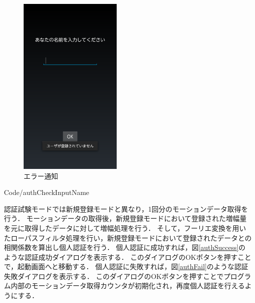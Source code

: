 \documentclass[11pt]{jreport}
\renewcommand{\slash}{/}
\begin{document}
\begin{figure}[htbp]
            \begin{minipage}{0.33\hsize}
                \begin{center}
                    \includegraphics[width=5cm, bb=0 0 540 960]{AuthNameInputError.pdf}
                \end{center}
                \caption{エラー通知}
                \label{authNameInputError}
            \end{minipage}
        \end{figure}

        \newpage
        
        {Code\slash authCheckInputName}

        認証試験モードでは新規登録モードと異なり，1回分のモーションデータ取得を行う．
        モーションデータの取得後，新規登録モードにおいて登録された増幅量を元に取得したデータに対して増幅処理を行う．
        そして，フーリエ変換を用いたローパスフィルタ処理を行い，新規登録モードにおいて登録されたデータとの相関係数を算出し個人認証を行う．
        個人認証に成功すれば，図\ref{authSuccess}のような認証成功ダイアログを表示する．
        このダイアログのOKボタンを押すことで，起動画面へと移動する．
        個人認証に失敗すれば，図\ref{authFail}のような認証失敗ダイアログを表示する．
        このダイアログのOKボタンを押すことでプログラム内部のモーションデータ取得カウンタが初期化され，再度個人認証を行えるようにする．
\end{document}
